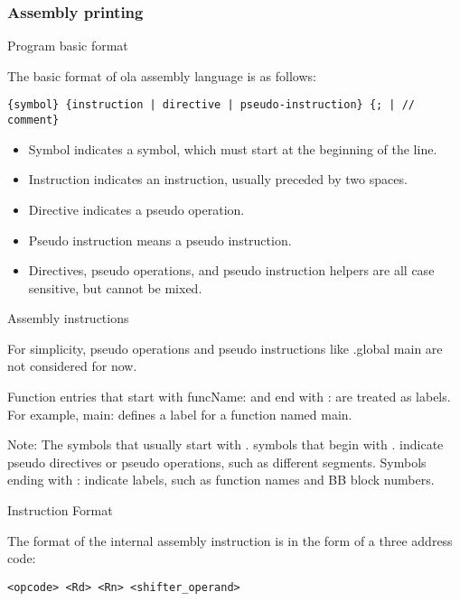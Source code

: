 \subsubsection{Assembly printing}

Program basic format\par
The basic format of ola assembly language is as follows:
\begin{lstlisting}[language={}]
{symbol} {instruction | directive | pseudo-instruction} {; | // comment}
\end{lstlisting}

\begin{itemize}
    \item Symbol indicates a symbol, which must start at the beginning of the line.\par
    \item Instruction indicates an instruction, usually preceded by two spaces.\par
    \item Directive indicates a pseudo operation.\par
    \item Pseudo instruction means a pseudo instruction.\par
    \item Directives, pseudo operations, and pseudo instruction helpers are all case sensitive, but cannot be mixed.
\end{itemize}

Assembly instructions\par

For simplicity, pseudo operations and pseudo instructions like .global main are not considered for now.\par

Function entries that start with funcName: and end with : are treated as labels. For example, main: defines a label for a function named main.

Note: The symbols that usually start with . symbols that begin with . indicate pseudo directives or pseudo operations, such as different segments. Symbols ending with : indicate labels, such as function names and BB block numbers.

Instruction Format\par
The format of the internal assembly instruction is in the form of a three address code:
\begin{lstlisting}[language={}]
    <opcode> <Rd> <Rn> <shifter_operand>
\end{lstlisting}

